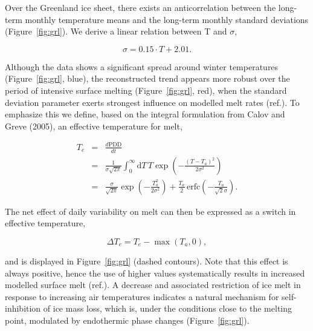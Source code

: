 \documentclass[review]{igs}
\begin{document}
Over the Greenland ice sheet, there exists an anticorrelation between the long-term monthly temperature means and the long-term monthly standard deviations (Figure~\ref{fig:grl}). We derive a linear relation between T and $\sigma$,

\begin{equation}
    \sigma = 0.15 \cdot T + 2.01.
\end{equation}

Although the data shows a significant spread around winter temperatures (Figure~\ref{fig:grl}, blue), the reconstructed trend appears more robust over the period of intensive surface melting (Figure~\ref{fig:grl}, red), when the standard deviation parameter exerts strongest influence on modelled melt rates (ref.). To emphasize this we define, based on the integral formulation from Calov and Greve (2005), an effective temperature for melt,

\begin{eqnarray} \label{eq:calovgreve}
    T_e &=& \frac{d\mathrm{PDD}}{dt}\\
        &=& \frac{1}{\sigma\sqrt{2\pi}}
            \int_{0}^{\infty} \mathrm{d}T \, T \exp\left({-\frac{(T-T_a)^2}{2\sigma^2}}\right)\\
        &=& \frac{\sigma}{\sqrt{2\pi}} \exp\left({-\frac{T_a^2}{2\sigma^2}}\right)
            + \frac{T_a}{2} \, \mathrm{erfc} \left(-\frac{T_a}{\sqrt{2}\sigma}\right).
\end{eqnarray}

The net effect of daily variability on melt can then be expressed as a switch in effective temperature,

\begin{equation}
    \Delta T_e = T_e - \max(T_a, 0),
\end{equation}

and is displayed in Figure~\ref{fig:grl} (dashed contours). Note that this effect is always positive, hence the use of higher  values systematically results in increased modelled surface melt (ref.). A  decrease and associated restriction of ice melt in response to increasing air temperatures indicates a natural mechanism for self-inhibition of ice mass loss, which is, under the conditions close to the melting point, modulated by endothermic phase changes (Figure~\ref{fig:grl}).
\end{document}
